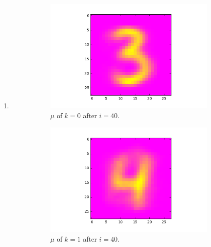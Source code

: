 \documentclass[a4paper,10pt]{article}
\numberwithin{equation}{section} %
\numberwithin{figure}{section} %
\numberwithin{table}{section} %
\theoremstyle{mytheor}
\begin{document}
\begin{enumerate}
	\item \begin{figure}[h!]
			\centering
			\begin{subfigure}[b]{0.24\textwidth}
				\includegraphics[width=\textwidth]{digits/39_k4_class0.png}\vspace{-0.4cm}
				\caption{$\mu$ of $k=0$ after $i=40$.}
			\end{subfigure}
			\begin{subfigure}[b]{0.24\textwidth}
				\includegraphics[width=\textwidth]{digits/39_k4_class1.png}\vspace{-0.4cm}
				\caption{$\mu$ of $k=1$ after $i=40$.}
			\end{subfigure}
			\begin{subfigure}[b]{0.24\textwidth}

\end{subfigure}
\end{figure}
\end{enumerate}
\end{document}
